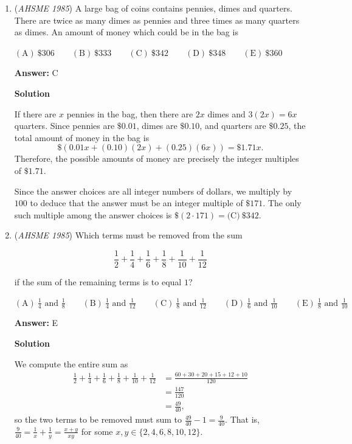 \begin{enumerate}
	\item (\textit{AHSME 1985}) A large bag of coins contains pennies, dimes and quarters. There are twice as many dimes as pennies and three times as many quarters as dimes. An amount of money which could be in the bag is


 $\mathrm{(A)\ } \$306 \qquad \mathrm{(B) \ }  \$333 \qquad \mathrm{(C)\ } \$342 \qquad \mathrm{(D) \  }  \$348 \qquad \mathrm{(E) \  }  \$360$

 \textbf{Answer: }C



\textbf{Solution}

If there are $x$ pennies in the bag, then there are $2x$ dimes and $3(2x) = 6x$ quarters. Since pennies are $\$0.01$, dimes are $\$0.10$, and quarters are $\$0.25$, the total amount of money in the bag is 
 \[\$ \left(0.01x+(0.10)(2x)+(0.25)(6x)\right) = \$1.71x.\] Therefore, the possible amounts of money are precisely the integer multiples of $\$1.71$. 

 Since the answer choices are all integer numbers of dollars, we multiply by $100$ to deduce that the answer must be an integer multiple of $\$171$. The only such multiple among the answer choices is $\$(2 \cdot 171) = \boxed{\text{(C)} \ \$342}$.

 


	\item (\textit{AHSME 1985}) Which terms must be removed from the sum


 
 \[\frac{1}{2}+\frac{1}{4}+\frac{1}{6}+\frac{1}{8}+\frac{1}{10}+\frac{1}{12}\]


 if the sum of the remaining terms is to equal $1$?


 $\mathrm{(A)\ } \frac{1}{4}\text{ and }\frac{1}{8} \qquad \mathrm{(B) \ }\frac{1}{4}\text{ and }\frac{1}{12} \qquad \mathrm{(C) \  } \frac{1}{8}\text{ and }\frac{1}{12} \qquad \mathrm{(D) \  } \frac{1}{6}\text{ and }\frac{1}{10} \qquad \mathrm{(E) \  }\frac{1}{8}\text{ and }\frac{1}{10}$

 \textbf{Answer: }E



\textbf{Solution}

We compute the entire sum as 
 \begin{align*}\frac{1}{2}+\frac{1}{4}+\frac{1}{6}+\frac{1}{8}+\frac{1}{10}+\frac{1}{12} &= \frac{60+30+20+15+12+10}{120} \\ &= \frac{147}{120} \\ &= \frac{49}{40},\end{align*}
so the two terms to be removed must sum to $\frac{49}{40}-1 = \frac{9}{40}$. That is, $\frac{9}{40} = \frac{1}{x}+\frac{1}{y}=\frac{x+y}{xy}$ for some $x,y \in \{2,4,6,8,10,12\}$.


\end{enumerate}
